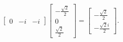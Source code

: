 \begin{frame}
\begin{solution}
\begin{align*}
\begin{bmatrix}
				0 & -i & -i
			\end{bmatrix}
			\begin{bmatrix}
				-\frac{\sqrt{2}}{2} \\
				0                   \\
				\frac{\sqrt{2}}{2}
			\end{bmatrix}=
			\begin{bmatrix}
				-\frac{\sqrt{2}}{2} \\
				-\frac{\sqrt{2}i}{2}
			\end{bmatrix}.
		\end{align*}

	\end{solution}
\end{frame}


